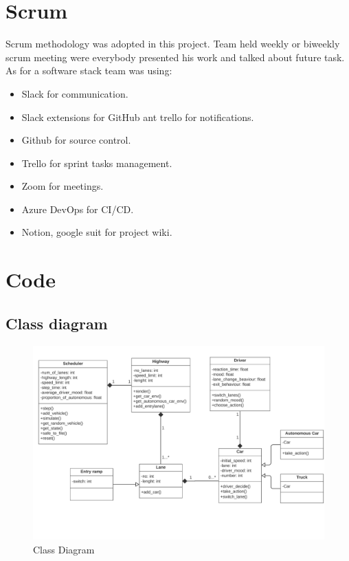 
\appendix
\onecolumn
\section{Scrum}
\label{appendix:appendix1}
Scrum methodology was adopted in this project. Team held weekly or biweekly scrum meeting were everybody presented his work and talked about future task. As for a software stack team was using:

\begin{itemize}
    \item Slack for communication.
    \item Slack extensions for GitHub ant trello for notifications.
    \item Github for source control.
    \item Trello for sprint tasks management.
    \item Zoom for meetings.
    \item Azure DevOps for CI/CD.
    \item Notion, google suit for project wiki.
\end{itemize}


\section{Code}
\label{appendix:appendix2}
\subsection{Class diagram}
\label{appendix:classDiagram}
\begin{figure}[H]
    \centering
    \includegraphics[width=\linewidth]{images/UML class (1).png}
    \caption{Class Diagram}
    \label{fig:classDiagram}
\end{figure}


